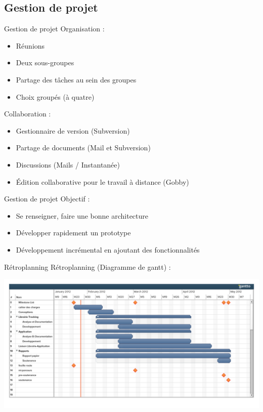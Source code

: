 \documentclass{beamer}
\begin{document}
	\subsection{Gestion de projet}
		\begin{frame}{Gestion de projet}
		Organisation :
			\begin{itemize}
				\item{Réunions}
				\item{Deux sous-groupes}
				\item{Partage des tâches au sein des groupes}
				\item{Choix groupés (à quatre)}
			\end{itemize}
		
		Collaboration :
			\begin{itemize}
				\item{Gestionnaire de version (Subversion)}
				\item{Partage de documents (Mail et Subversion)}
				\item{Discussions (Mails / Instantanée)}
				\item{Édition collaborative pour le travail à distance (Gobby)}
			\end{itemize}
		\end{frame}
		
		\begin{frame}{Gestion de projet}
			Objectif :
			\begin{itemize}
			\item Se renseigner, faire une bonne architecture
			\item Développer rapidement un prototype
			\item Développement incrémental en ajoutant des fonctionnalités
			\end{itemize} 
		\end{frame}
		
		\begin{frame}{Rétroplanning}	
			Rétroplanning (Diagramme de gantt) :
			\begin{center}
			\includegraphics[scale=0.25]{../feuille-route/retroplanning.pdf}
			\end{center}
		\end{frame}
	
\end{document}

